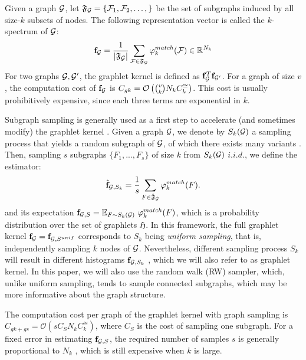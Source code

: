 \documentclass{article}
\begin{document}
Given a graph $\mathcal{G}$, let $\mathfrak{F}_{\mathcal{G}}=\{\mathcal{F}_1,\mathcal{F}_2,\ldots,\}$ be the set of subgraphs induced by all size-$k$ subsets of nodes. The following representation vector is called the $k$-spectrum of $\mathcal{G}$:
\begin{equation}
\mathbf{f}_{\mathcal{G}}=\frac{1}{|\mathfrak{F}_\mathcal{G}|}\sum_{\mathcal{F}\in\mathfrak{F}_\mathcal{G}} \varphi^{match}_k (\mathcal{F}) \in \mathbb{R}^{N_k}
\end{equation}
For two graphs $\mathcal{G},\mathcal{G}'$, the graphlet kernel is defined as $\mathbf{f}_{\mathcal{G}}^T\mathbf{f}_{\mathcal{G}'}$. %
For a graph of size $v$, the computation cost of $\mathbf{f}_{\mathcal{G}}$ is $C_{gk}= \mathcal{O}\left(\tbinom{v}{k}N_k C^{\cong}_k\right)$. This cost is usually prohibitively expensive, since each three terms are exponential in $k$.

Subgraph sampling is generally used as a first step to accelerate (and sometimes modify) the graphlet kernel \cite{graphlet_kernel}. Given a graph $\mathcal{G}$, we denote by $S_k(\mathcal{G})$ a sampling process that yields a random subgraph of $\mathcal{G}$, of which there exists many variants \cite{lesco}. Then, sampling $s$ subgraphs $\{F_1,...,F_s\}$ of size $k$ from $S_k(\mathcal{G})$ $i.i.d.$, we define the estimator:
\begin{align}
	\label{eq:fhat_unif}
	\hat{\mathbf{f}}_{\mathcal{G},S_k} =\frac{1}{s}\sum_{F\in\hat{\mathfrak{F}}_{\mathcal{G}}} \varphi^{match}_k(F).
\end{align}
and its expectation $\mathbf{f}_{\mathcal{G},S} = \mathbb{E}_{F \sim S_k(\mathcal{G})} ~\varphi^{match}_k(F)$, which is a probability distribution over the set of graphlets $\mathfrak{H}$. In this framework, the full graphlet kernel $\mathbf{f}_{\mathcal{G}} = \mathbf{f}_{\mathcal{G}, S^{unif}}$ corresponds to $S_k$ being \emph{uniform sampling}, that is, independently sampling $k$ nodes of $\mathcal{G}$. %
Nevertheless, different sampling process $S_k$ will result in different histograms $\mathbf{f}_{\mathcal{G},S_k}$ \cite{leskovec2006sampling}, which we will also refer to as graphlet kernel. In this paper, we will also use the random walk (RW) sampler, which, unlike uniform sampling, tends to sample connected subgraphs, which may be more informative about the graph structure. 

The computation cost per graph of the graphlet kernel with graph sampling is $C_{gk + gs}= \mathcal{O}\left(s C_S N_k C^{\cong}_k\right)$, where $C_S$ is the cost of sampling one subgraph. %
For a fixed error in estimating $\mathbf{f}_{\mathcal{G},S}$, the required number of samples $s$ is generally proportional to $N_k$ \cite{graphlet_kernel}, which is still expensive when $k$ is large. 
\end{document}
